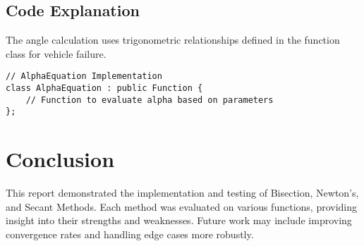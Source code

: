 \documentclass{article}
\begin{document}
\subsection{Code Explanation}
The angle calculation uses trigonometric relationships defined in the function class for vehicle failure.

\begin{verbatim}
// AlphaEquation Implementation
class AlphaEquation : public Function {
    // Function to evaluate alpha based on parameters
};
\end{verbatim}

\section{Conclusion}
This report demonstrated the implementation and testing of Bisection, Newton's, and Secant Methods. Each method was evaluated on various functions, providing insight into their strengths and weaknesses. Future work may include improving convergence rates and handling edge cases more robustly.
\end{document}

